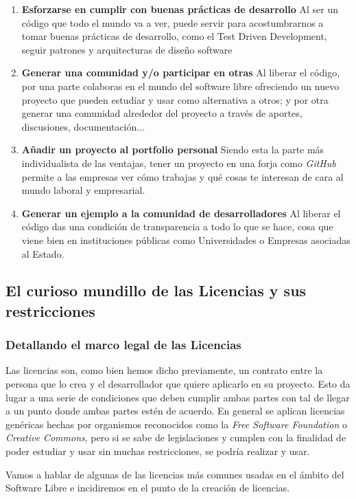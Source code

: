 \begin{enumerate}
	\item \textbf{Esforzarse en cumplir con buenas prácticas de desarrollo} Al ser un código que todo el mundo va a ver, puede servir para acostumbrarnos a tomar buenas prácticas de desarrollo, como el Test Driven Development, seguir patrones y arquitecturas de diseño software
	\item \textbf{Generar una comunidad y/o participar en otras} Al liberar el código, por una parte colaboras en el mundo del software libre ofreciendo un nuevo proyecto que pueden estudiar y usar como alternativa a otros; y por otra generar una comunidad alrededor del proyecto a través de aportes, discusiones, documentación...
	\item \textbf{Añadir un proyecto al portfolio personal} Siendo esta la parte más individualista de las ventajas, tener un proyecto en una forja como \textit{GitHub} permite a las empresas ver cómo trabajas y qué cosas te interesan de cara al mundo laboral y empresarial.
	\item \textbf{Generar un ejemplo a la comunidad de desarrolladores} Al liberar el código das una condición de transparencia a todo lo que se hace, cosa que viene bien en instituciones públicas como Universidades o Empresas asociadas al Estado.
\end{enumerate}



\subsection{El curioso mundillo de las Licencias y sus restricciones}

\subsubsection{Detallando el marco legal de las Licencias}
Las licencias son, como bien hemos dicho previamente, un contrato entre la persona que lo crea y el desarrollador que quiere aplicarlo en su proyecto. Esto da lugar a una serie de condiciones que deben cumplir ambas partes con tal de llegar a un punto donde ambas partes estén de acuerdo. En general se aplican licencias genéricas hechas por organismos reconocidos como la \textit{Free Software Foundation} o \textit{Creative Commons}, pero si se sabe de legislaciones y cumplen con la finalidad de poder estudiar y usar sin muchas restricciones, se podría realizar y usar.

Vamos a hablar de algunas de las licencias más comunes usadas en el ámbito del Software Libre e incidiremos en el punto de la creación de licencias.

